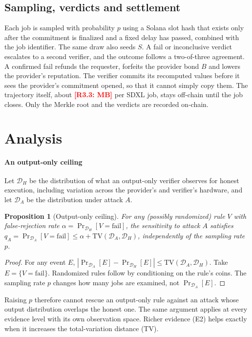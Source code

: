 \documentclass[preprint,review,12pt,authoryear]{elsarticle}
\newcommand{\res}[1]{\textcolor{red}{\textbf{[#1]}}}          %
\newtheorem{proposition}{Proposition}
\theoremstyle{definition}
\begin{document}
\subsection{Sampling, verdicts and settlement}
Each job is sampled with probability $p$ using a Solana slot hash that exists only after the commitment is finalized and a fixed delay has passed, combined with the job identifier. The same draw also seeds $S$. A fail or inconclusive verdict escalates to a second verifier, and the outcome follows a two-of-three agreement. A confirmed fail refunds the requester, forfeits the provider bond $B$ and lowers the provider's reputation. The verifier commits its recomputed values before it sees the provider's commitment opened, so that it cannot simply copy them. The trajectory itself, about \res{R3.3: MB} per SDXL job, stays off-chain until the job closes. Only the Merkle root and the verdicts are recorded on-chain.

\section{Analysis}\label{sec:analysis}

\paragraph{An output-only ceiling}
Let $\mathcal{D}_H$ be the distribution of what an output-only verifier observes for honest execution, including variation across the provider's and verifier's hardware, and let $\mathcal{D}_A$ be the distribution under attack $A$.

\begin{proposition}[Output-only ceiling]\label{prop:ceiling}
For any (possibly randomized) rule $V$ with false-rejection rate $\alpha=\Pr_{\mathcal{D}_H}[V=\mathrm{fail}]$, the sensitivity to attack $A$ satisfies $q_A=\Pr_{\mathcal{D}_A}[V=\mathrm{fail}]\le\alpha+\mathrm{TV}(\mathcal{D}_A,\mathcal{D}_H)$, independently of the sampling rate $p$.
\end{proposition}
\begin{proof}
For any event $E$, $|\Pr_{\mathcal{D}_A}[E]-\Pr_{\mathcal{D}_H}[E]|\le\mathrm{TV}(\mathcal{D}_A,\mathcal{D}_H)$. Take $E=\{V=\mathrm{fail}\}$. Randomized rules follow by conditioning on the rule's coins. The sampling rate $p$ changes how many jobs are examined, not $\Pr_{\mathcal{D}_A}[E]$.
\end{proof}
Raising $p$ therefore cannot rescue an output-only rule against an attack whose output distribution overlaps the honest one. The same argument applies at every evidence level with its own observation space. Richer evidence (E2) helps exactly when it increases the total-variation distance (TV).
\end{document}
